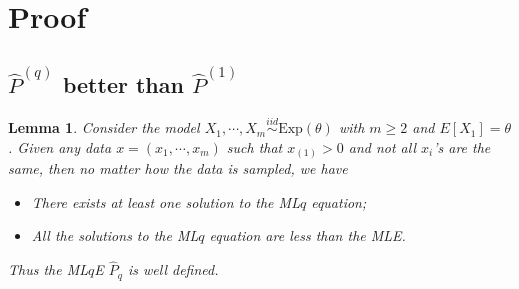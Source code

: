 \documentclass[a4paper]{article}
\newtheorem{lemma}[fact]{Lemma}
\begin{document}
\newpage

\section{Proof}

\subsection{$\hat{P}^{(q)}$ better than $\hat{P}^{(1)}$}

\begin{lemma}
\label{lemma:LqlMLE}
Consider the model $X_1, \cdots, X_m \stackrel{iid}{\sim} \mathrm{Exp}(\theta)$ with $m \ge 2$ and $E[X_1] = \theta$. Given any data $x = (x_1, \cdots, x_m)$ such that $x_{(1)} > 0$ and not all $x_i$'s are the same, then no matter how the data is sampled, we have
\begin{itemize}
\item There exists at least one solution to the ML$q$ equation;
\item All the solutions to the ML$q$ equation are less than the MLE.
\end{itemize}
Thus the ML$q$E $\hat{P}_q$ is well defined.
\end{lemma}
\end{document}
